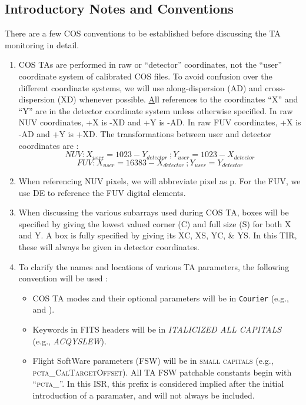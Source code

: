 \subsection{Introductory Notes and Conventions}\label{subsec:conventions}
There are a few COS conventions to be established before discussing the TA monitoring in detail.
\begin{enumerate}
	\item{COS TAs are performed in raw or ``detector'' coordinates, not the ``user'' coordinate system of calibrated
		COS files. To avoid confusion over the different coordinate systems, we will use along-dispersion (AD) and cross-dispersion (XD) whenever possible.
		{\ul All references to the coordinates ``X'' and ``Y'' are in the detector coordinate system unless otherwise specified.}
		In raw NUV coordinates, +X is -XD and +Y is -AD. In raw FUV coordinates, +X is -AD and +Y is +XD.
		The transformations between user and detector coordinates are :
		\begin{equation} NUV: X_{user} = 1023 - Y_{detector} \ ; Y_{user} = 1023 - X_{detector} \end{equation}
		\begin{equation} FUV: X_{user} = 16383 - X_{detector} \ ; Y_{user} = Y_{detector} \end{equation}
		}
	\item{When referencing NUV pixels, we will abbreviate pixel as p. For the FUV, we use DE to reference the FUV digital elements.}
	\item{When discussing the various subarrays used during COS TA, boxes will be specified by giving the lowest
		valued corner (C) and full size (S) for both X and Y. A box is fully specified by giving its XC, XS, YC, \& YS. In this TIR, these will always be given in detector coordinates.}
	\item{To clarify the names and locations of various TA parameters, the following convention will be used :
		\begin{itemize}
			\item{COS TA modes and their optional parameters will be in \texttt{Courier} (e.g.,  and \numpos).}
			\item{Keywords in FITS headers will be in \textit{ITALICIZED ALL CAPITALS} (e.g., \textit{ACQYSLEW}).}
			\item{Flight SoftWare parameters (FSW) will be in \textsc{small capitals} (e.g., \textsc{pcta\_CalTargetOffset}).
All TA FSW patchable constants begin with ``\textsc{pcta\_}''. In this ISR, this prefix is considered implied after the initial introduction of a paramater, and will not always be included.}

\end{itemize}}
\end{enumerate}
